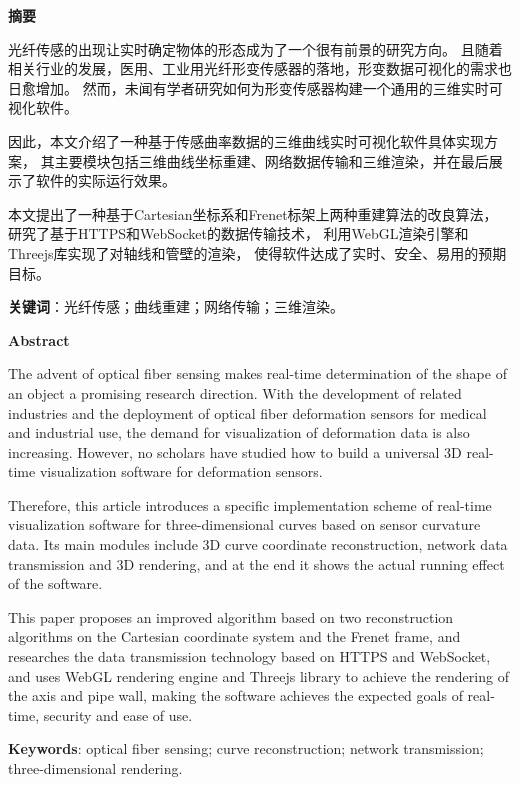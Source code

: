 \clearpage
\begin{center}
    \bfseries {} 摘要
\end{center}

光纤传感的出现让实时确定物体的形态成为了一个很有前景的研究方向。
且随着相关行业的发展，医用、工业用光纤形变传感器的落地，形变数据可视化的需求也日愈增加。
然而，未闻有学者研究如何为形变传感器构建一个通用的三维实时可视化软件。

因此，本文介绍了一种基于传感曲率数据的三维曲线实时可视化软件具体实现方案，
其主要模块包括三维曲线坐标重建、网络数据传输和三维渲染，并在最后展示了软件的实际运行效果。

本文提出了一种基于Cartesian坐标系和Frenet标架上两种重建算法的改良算法，
研究了基于HTTPS和WebSocket的数据传输技术，
利用WebGL渲染引擎和Threejs库实现了对轴线和管壁的渲染，
使得软件达成了实时、安全、易用的预期目标。

\textbf{关键词}：光纤传感；曲线重建；网络传输；三维渲染。

\clearpage{}

\begin{center}
    \bfseries {} Abstract
\end{center}

The advent of optical fiber sensing makes real-time determination of the shape of an object a promising research direction.
With the development of related industries and the deployment of optical fiber deformation sensors for medical and industrial use, the demand for visualization of deformation data is also increasing.
However, no scholars have studied how to build a universal 3D real-time visualization software for deformation sensors.

Therefore, this article introduces a specific implementation scheme of real-time visualization software for three-dimensional curves based on sensor curvature data.
Its main modules include 3D curve coordinate reconstruction, network data transmission and 3D rendering, and at the end it shows the actual running effect of the software.

This paper proposes an improved algorithm based on two reconstruction algorithms on the Cartesian coordinate system and the Frenet frame,
and researches the data transmission technology based on HTTPS and WebSocket,
and uses WebGL rendering engine and Threejs library to achieve the rendering of the axis and pipe wall,
making the software achieves the expected goals of real-time, security and ease of use.

\textbf{Keywords}: optical fiber sensing; curve reconstruction; network transmission; three-dimensional rendering.